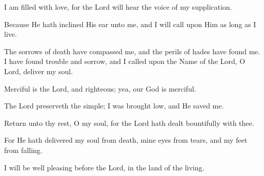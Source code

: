 I am filled with love, for the Lord will hear the voice of my supplication.

Because He hath inclined His ear unto me, and I will call upon Him as long as I live.

The sorrows of death have compassed me, and the perils of hades have found me. I have found trouble and sorrow, and I called upon the Name of the Lord, O Lord, deliver my soul.

Merciful is the Lord, and righteous; yea, our God is merciful.

The Lord preserveth the simple; I was brought low, and He saved me.

Return unto thy rest, O my soul, for the Lord hath dealt bountifully with thee.

For He hath delivered my soul from death, mine eyes from tears, and my feet from falling.

I will be well pleasing before the Lord, in the land of the living.
